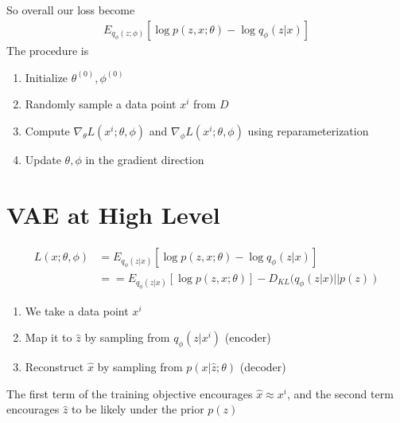 So overall our loss become 
    \begin{align*}
        E_{q_\phi(z;\phi)}[\log p(z,x;\theta) - \log q_\phi(z|x)]
    \end{align*}
The procedure is 
    \begin{enumerate}
        \item Initialize $\theta^{(0)}, \phi^{(0)}$
        \item Randomly sample a data point $x^i$ from $D$
        \item Compute $\nabla_\theta L(x^i;\theta,\phi)$ and $\nabla_\phi L(x^i;\theta, \phi)$ using reparameterization 
        \item Update $\theta, \phi$ in the gradient direction 
    \end{enumerate}
    
\section{VAE at High Level} 
\begin{align*}
    L(x;\theta, \phi) 
    & = E_{q_\phi(z|x)}[\log p(z,x;\theta) - \log q_\phi(z|x)]\\
    & = = E_{q_\phi(z|x)}[\log p(z,x;\theta)]  - D_{KL}(q_\phi(z|x) || p(z))
\end{align*}
\begin{enumerate}
    \item We take a data point $x^i$
    \item Map it to $\hat{z}$ by sampling from $q_\phi(z|x^i)$ (encoder)
    \item Reconstruct $\hat{x}$ by sampling from $p(x|\hat{z};\theta)$ (decoder)
\end{enumerate}
The first term of the training objective encourages $\hat{x} \approx x^i$, and the second term encourages $\hat{z}$ to be likely under the prior $p(z)$